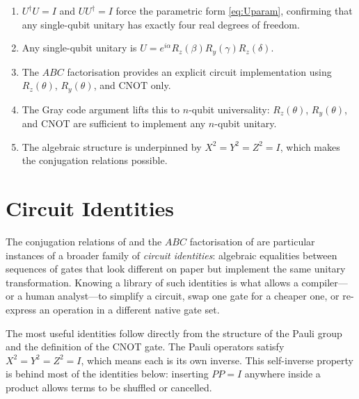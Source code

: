 \documentclass[12pt, a4paper, oneside]{report}
\theoremstyle{plain}
\theoremstyle{definition}
\theoremstyle{remark}
\newcommand{\CNOT}{\mathrm{CNOT}}
\newcommand{\Ry}{R_y}
\newcommand{\Rz}{R_z}
\begin{document}
\begin{enumerate}[label=(\roman*)]
  \item $U^\dagger U = I$ and $UU^\dagger = I$ force the parametric form \cref{eq:Uparam},
        confirming that any single-qubit unitary has exactly four real degrees of freedom.
  \item Any single-qubit unitary is $U = e^{i\alpha}\Rz(\beta)\Ry(\gamma)\Rz(\delta)$.
  \item The $ABC$ factorisation provides an explicit circuit implementation using
        $\Rz(\theta)$, $\Ry(\theta)$, and $\CNOT$ only.
  \item The Gray code argument lifts this to $n$-qubit universality: $\Rz(\theta)$,
        $\Ry(\theta)$, and $\CNOT$ are sufficient to implement any $n$-qubit unitary.
  \item The algebraic structure is underpinned by $X^2 = Y^2 = Z^2 = I$, which makes the
        conjugation relations  possible.
\end{enumerate}





\section{Circuit Identities}

The conjugation relations of  and the $ABC$ factorisation
of  are particular instances of a broader family of \emph{circuit identities}:
algebraic equalities between sequences of gates that look different on paper but implement
the same unitary transformation. Knowing a library of such identities is what allows a
compiler---or a human analyst---to simplify a circuit, swap one gate for a cheaper one, or
re-express an operation in a different native gate set.

The most useful identities follow directly from the structure of the Pauli group and the
definition of the CNOT gate. The Pauli operators satisfy $X^2 = Y^2 = Z^2 = I$, which means
each is its own inverse. This self-inverse property is behind most of the identities below:
inserting $PP = I$ anywhere inside a product allows terms to be shuffled or cancelled.
\end{document}
